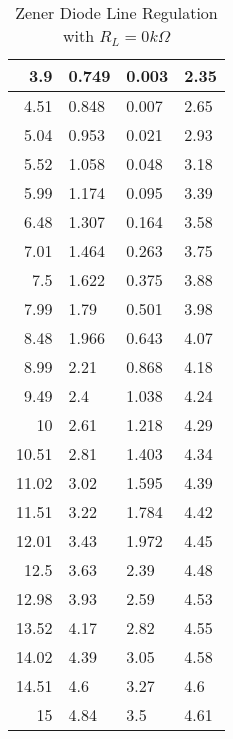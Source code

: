 \documentclass{scrartcl}
\newcommand{\1}{\mathbbm{1}}
\begin{document}
\begin{itemize}
\begin{table}[!ht]
\begin{tabular}{|r|l|l|l|}
         3.9 & 0.749 & 0.003 & 2.35 \\ \hline
         4.51 & 0.848 & 0.007 & 2.65 \\ \hline
         5.04 & 0.953 & 0.021 & 2.93 \\ \hline
         5.52 & 1.058 & 0.048 & 3.18 \\ \hline
         5.99 & 1.174 & 0.095 & 3.39 \\ \hline
         6.48 & 1.307 & 0.164 & 3.58 \\ \hline
         7.01 & 1.464 & 0.263 & 3.75 \\ \hline
         7.5 & 1.622 & 0.375 & 3.88 \\ \hline
         7.99 & 1.79 & 0.501 & 3.98 \\ \hline
         8.48 & 1.966 & 0.643 & 4.07 \\ \hline
         8.99 & 2.21 & 0.868 & 4.18 \\ \hline
         9.49 & 2.4 & 1.038 & 4.24 \\ \hline
         10 & 2.61 & 1.218 & 4.29 \\ \hline
         10.51 & 2.81 & 1.403 & 4.34 \\ \hline
         11.02 & 3.02 & 1.595 & 4.39 \\ \hline
         11.51 & 3.22 & 1.784 & 4.42 \\ \hline
         12.01 & 3.43 & 1.972 & 4.45 \\ \hline
         12.5 & 3.63 & 2.39 & 4.48 \\ \hline
         12.98 & 3.93 & 2.59 & 4.53 \\ \hline
         13.52 & 4.17 & 2.82 & 4.55 \\ \hline
         14.02 & 4.39 & 3.05 & 4.58 \\ \hline
         14.51 & 4.6 & 3.27 & 4.6 \\ \hline
         15 & 4.84 & 3.5 & 4.61 \\ \hline
    \end{tabular}
    \caption{Zener Diode Line Regulation with $R_L = 0 k\Omega$}
	\label{tab:ZD linereg}
\end{table} 


\end{itemize}
\end{document}
